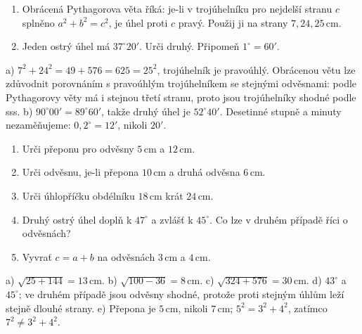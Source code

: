 \documentclass[11pt,a4paper]{article}
\begin{document}
\newpage
{}
\begin{zadaniReseniBox}[title={R1: obrácená věta a minuty},breakable=false]
\begin{enumerate}[label=\alph*)]
\item Obrácená Pythagorova věta říká: je-li v trojúhelníku pro nejdelší
stranu $c$ splněno $a^2+b^2=c^2$, je úhel proti $c$ pravý.
Použij ji na strany $7,24,25\,\mathrm{cm}$.
\item Jeden ostrý úhel má $37^\circ20'$. Urči druhý. Připomeň $1^\circ=60'$.
\end{enumerate}
\tcblower
a) $7^2+24^2=49+576=625=25^2$, trojúhelník je pravoúhlý.
Obrácenou větu lze zdůvodnit porovnáním s pravoúhlým trojúhelníkem
se stejnými odvěsnami: podle Pythagorovy věty má i stejnou třetí stranu,
proto jsou trojúhelníky shodné podle sss.
b) $90^\circ00'=89^\circ60'$, takže druhý úhel je $52^\circ40'$.
Desetinné stupně a minuty nezaměňujeme: $0{,}2^\circ=12'$, nikoli $20'$.
\end{zadaniReseniBox}

\begin{zadaniReseniBox}[title={D1: 12–18 minut},breakable=false]
\begin{enumerate}[label=\alph*)]
\item Urči přeponu pro odvěsny $5\,\mathrm{cm}$ a $12\,\mathrm{cm}$.
\item Urči odvěsnu, je-li přepona $10\,\mathrm{cm}$ a druhá odvěsna $6\,\mathrm{cm}$.
\item Urči úhlopříčku obdélníku $18\,\mathrm{cm}$ krát $24\,\mathrm{cm}$.
\item Druhý ostrý úhel doplň k $47^\circ$ a zvlášť k $45^\circ$.
Co lze v druhém případě říci o odvěsnách?
\item Vyvrať $c=a+b$ na odvěsnách $3\,\mathrm{cm}$ a $4\,\mathrm{cm}$.
\end{enumerate}
\tcblower
a) $\sqrt{25+144}=13\,\mathrm{cm}$.
b) $\sqrt{100-36}=8\,\mathrm{cm}$.
c) $\sqrt{324+576}=30\,\mathrm{cm}$.
d) $43^\circ$ a $45^\circ$; ve druhém případě jsou odvěsny shodné,
protože proti stejným úhlům leží stejně dlouhé strany.
e) Přepona je $5\,\mathrm{cm}$, nikoli $7\,\mathrm{cm}$;
$5^2=3^2+4^2$, zatímco $7^2\ne3^2+4^2$.
\end{zadaniReseniBox}
\end{document}

